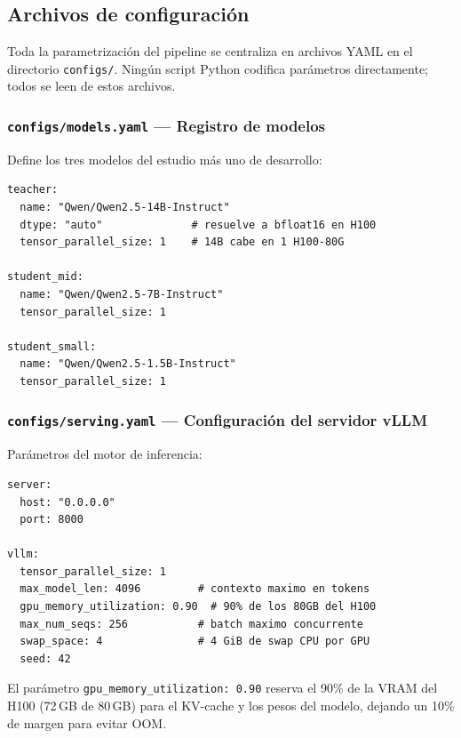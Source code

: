 \documentclass[11pt,a4paper]{article}
\begin{document}
\subsection{Archivos de configuraci\'on}
\label{sec:configs}

Toda la parametrizaci\'on del pipeline se centraliza en archivos YAML
en el directorio \texttt{configs/}. Ning\'un script Python codifica
par\'ametros directamente; todos se leen de estos archivos.

\subsubsection{\texttt{configs/models.yaml} --- Registro de modelos}

Define los tres modelos del estudio m\'as uno de desarrollo:

\begin{lstlisting}[language={},caption={Extracto de models.yaml}]
teacher:
  name: "Qwen/Qwen2.5-14B-Instruct"
  dtype: "auto"              # resuelve a bfloat16 en H100
  tensor_parallel_size: 1    # 14B cabe en 1 H100-80G

student_mid:
  name: "Qwen/Qwen2.5-7B-Instruct"
  tensor_parallel_size: 1

student_small:
  name: "Qwen/Qwen2.5-1.5B-Instruct"
  tensor_parallel_size: 1
\end{lstlisting}

\subsubsection{\texttt{configs/serving.yaml} --- Configuraci\'on del servidor vLLM}

Par\'ametros del motor de inferencia:

\begin{lstlisting}[language={},caption={Extracto de serving.yaml}]
server:
  host: "0.0.0.0"
  port: 8000

vllm:
  tensor_parallel_size: 1
  max_model_len: 4096         # contexto maximo en tokens
  gpu_memory_utilization: 0.90  # 90% de los 80GB del H100
  max_num_seqs: 256           # batch maximo concurrente
  swap_space: 4               # 4 GiB de swap CPU por GPU
  seed: 42
\end{lstlisting}

El par\'ametro \texttt{gpu\_memory\_utilization: 0.90} reserva el 90\%
de la VRAM del H100 (72\,GB de 80\,GB) para el KV-cache y los pesos
del modelo, dejando un 10\% de margen para evitar OOM.
\end{document}
